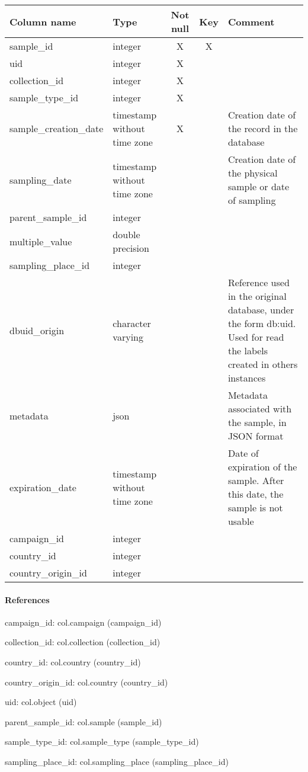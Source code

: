 \begin{tabular}{|l| p{2cm}|c|c| p{5cm}|}
\hline
Column name & Type & Not null & Key & Comment \\
\hline
sample\_id & integer & X & X & \\
uid & integer & X &  & \\
collection\_id & integer & X &  & \\
sample\_type\_id & integer & X &  & \\
sample\_creation\_date & timestamp without time zone & X &  & Creation date of the record in the database\\
sampling\_date & timestamp without time zone &  &  & Creation date of the physical sample or date of sampling\\
parent\_sample\_id & integer &  &  & \\
multiple\_value & double precision &  &  & \\
sampling\_place\_id & integer &  &  & \\
dbuid\_origin & character varying &  &  & Reference used in the original database, under the form db:uid. Used for read the labels created in others instances\\
metadata & json &  &  & Metadata associated with the sample, in JSON format\\
expiration\_date & timestamp without time zone &  &  & Date of expiration of the sample. After this date, the sample is not usable\\
campaign\_id & integer &  &  & \\
country\_id & integer &  &  & \\
country\_origin\_id & integer &  &  & \\
\hline
\end{tabular}
\paragraph{References}
campaign\_id: col.campaign (campaign\_id)

collection\_id: col.collection (collection\_id)

country\_id: col.country (country\_id)

country\_origin\_id: col.country (country\_id)

uid: col.object (uid)

parent\_sample\_id: col.sample (sample\_id)

sample\_type\_id: col.sample\_type (sample\_type\_id)

sampling\_place\_id: col.sampling\_place (sampling\_place\_id)


